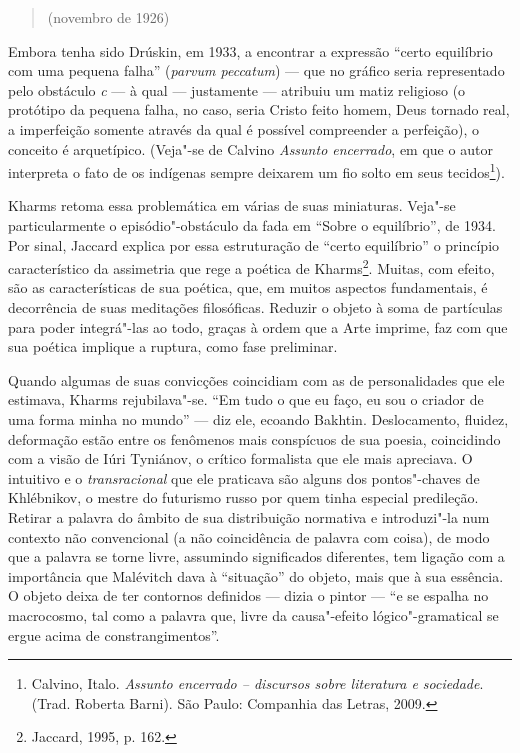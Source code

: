 {\begin{quote}
\noindent{}(novembro de 1926)
\end{quote}

Embora tenha sido Drúskin, em 1933, a encontrar a expressão ``certo
equilíbrio com uma pequena falha'' (\emph{parvum peccatum}) --- que no
gráfico seria representado pelo obstáculo \emph{c} --- à qual ---
justamente --- atribuiu um matiz religioso (o protótipo da pequena falha,
no caso, seria Cristo feito homem, Deus tornado real, a imperfeição
somente através da qual é possível compreender a perfeição), o conceito
é arquetípico. (Veja"-se de Calvino \emph{Assunto
encerrado}, em que o autor interpreta o fato de os indígenas sempre
deixarem um fio solto em seus tecidos\footnote{Calvino, Italo. \emph{Assunto encerrado -- discursos sobre literatura
e sociedade}. (Trad. Roberta Barni). São Paulo: Companhia das Letras, 2009.}).

Kharms retoma essa problemática em várias de suas miniaturas. Veja"-se
particularmente o episódio"-obstáculo da fada em ``Sobre o equilíbrio'',
de 1934. Por sinal, Jaccard explica por essa estruturação de ``certo equilíbrio'' o princípio característico da
assimetria que rege a poética de Kharms\footnote{Jaccard, 1995, p. 162.}. Muitas, com efeito, são as
características de sua poética, que, em muitos aspectos fundamentais, é
decorrência de suas meditações filosóficas. Reduzir o objeto à soma de
partículas para poder integrá"-las ao todo, graças à ordem que a Arte
imprime, faz com que sua poética implique a ruptura, como fase
preliminar.

Quando algumas de suas convicções coincidiam com as de personalidades
que ele estimava, Kharms rejubilava"-se. ``Em tudo o que eu faço, eu sou
o criador de uma forma minha no mundo'' --- diz ele, ecoando Bakhtin.
Deslocamento, fluidez, deformação estão entre os fenômenos mais
conspícuos de sua poesia, coincidindo com a visão de Iúri Tyniánov, o
crítico formalista que ele mais apreciava. O intuitivo e o
\emph{transracional} que ele praticava são alguns dos pontos"-chaves de
Khlébnikov, o mestre do futurismo russo por quem tinha especial
predileção. Retirar a palavra do âmbito de sua distribuição normativa e
introduzi"-la num contexto não convencional (a não coincidência de
palavra com coisa), de modo que a palavra se torne livre, assumindo
significados diferentes, tem ligação com a importância que Malévitch
dava à ``situação'' do objeto, mais que à sua essência. O objeto deixa
de ter contornos definidos --- dizia o pintor --- ``e se espalha no
macrocosmo, tal como a palavra que, livre da causa"-efeito
lógico"-gramatical se ergue acima de constrangimentos''.

}

